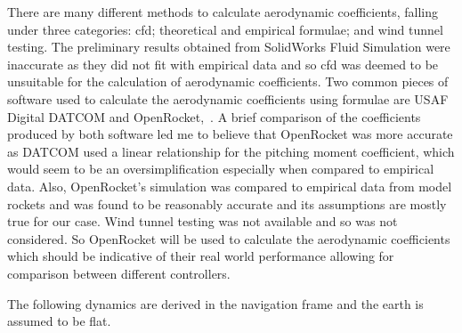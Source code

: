 There are many different methods to calculate aerodynamic coefficients, falling under three categories: \gls{cfd}; theoretical and empirical formulae; and wind tunnel testing.
The preliminary results obtained from SolidWorks Fluid Simulation were inaccurate as they did not fit with empirical data and so \gls{cfd} was deemed to be unsuitable for the calculation of aerodynamic coefficients.
Two common pieces of software used to calculate the aerodynamic coefficients using formulae are USAF Digital DATCOM and OpenRocket,~\cite{OR}.
A brief comparison of the coefficients produced by both software led me to believe that OpenRocket was more accurate as DATCOM used a linear relationship for the pitching moment coefficient, which would seem to be an oversimplification especially when compared to empirical data.
Also, OpenRocket's simulation was compared to empirical data from model rockets and was found to be reasonably accurate and its assumptions are mostly true for our case.
Wind tunnel testing was not available and so was not considered.
So OpenRocket will be used to calculate the aerodynamic coefficients which should be indicative of their real world performance allowing for comparison between different controllers.

The following dynamics are derived in the navigation frame and the earth is assumed to be flat.